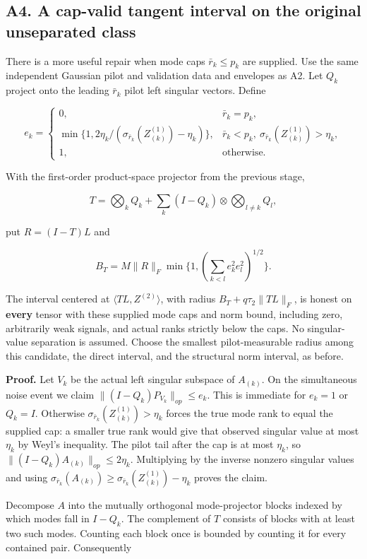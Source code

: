 \documentclass[
  10pt,
]{article}
\begin{document}
\subsection{A4. A cap-valid tangent interval on the original unseparated
class}\label{a4.-a-cap-valid-tangent-interval-on-the-original-unseparated-class}

There is a more useful repair when mode caps \(\bar r_k\le p_k\) are
supplied. Use the same independent Gaussian pilot and validation data
and envelopes as A2. Let \(Q_k\) project onto the leading \(\bar r_k\)
pilot left singular vectors. Define

\[e_k=\begin{cases}
0,&\bar r_k=p_k,\\
\min\{1,2\eta_k/(\sigma_{\bar r_k}(Z^{(1)}_{(k)})-\eta_k)\},
&\bar r_k<p_k,\ \sigma_{\bar r_k}(Z^{(1)}_{(k)})>\eta_k,\\
1,&\text{otherwise}.
\end{cases}\]

With the first-order product-space projector from the previous stage,

\[T=\bigotimes_k Q_k+\sum_k(I-Q_k)\otimes\bigotimes_{l\ne k}Q_l,\]

put \(R=(I-T)L\) and

\[B_T=M\|R\|_F\min\{1,(\sum_{k<l}e_k^2e_l^2)^{1/2}\}.\]

The interval centered at \(\langle TL,Z^{(2)}\rangle\), with radius
\(B_T+q\tau_2\|TL\|_F\), is honest on \textbf{every} tensor with these
supplied mode caps and norm bound, including zero, arbitrarily weak
signals, and actual ranks strictly below the caps. No singular-value
separation is assumed. Choose the smallest pilot-measurable radius among
this candidate, the direct interval, and the structural norm interval,
as before.

\textbf{Proof.} Let \(V_k\) be the actual left singular subspace of
\(A_{(k)}\). On the simultaneous noise event we claim
\(\|(I-Q_k)P_{V_k}\|_{op}\le e_k\). This is immediate for \(e_k=1\) or
\(Q_k=I\). Otherwise \(\sigma_{\bar r_k}(Z^{(1)}_{(k)})>\eta_k\) forces
the true mode rank to equal the supplied cap: a smaller true rank would
give that observed singular value at most \(\eta_k\) by Weyl's
inequality. The pilot tail after the cap is at most \(\eta_k\), so
\(\|(I-Q_k)A_{(k)}\|_{op}\le2\eta_k\). Multiplying by the inverse
nonzero singular values and using \(\sigma_{\bar r_k}(A_{(k)})\ge
\sigma_{\bar r_k}(Z^{(1)}_{(k)})-\eta_k\) proves the claim.

Decompose \(A\) into the mutually orthogonal mode-projector blocks
indexed by which modes fall in \(I-Q_k\). The complement of \(T\)
consists of blocks with at least two such modes. Counting each block
once is bounded by counting it for every contained pair. Consequently
\end{document}
